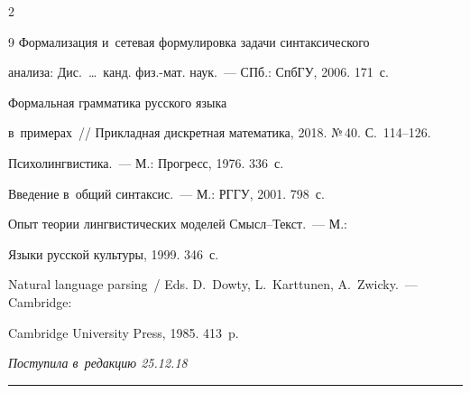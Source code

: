 \begin{multicols}{2}
{{\begin{thebibliography}{9}
 Формализация и~сетевая формулировка задачи синтаксического 

анализа: Дис.\ \ldots\ канд. физ.-мат. наук.~--- СПб.: СпбГУ, 2006. 171~с.


 Формальная грамматика русского языка 

в~примерах~// Прикладная дискретная математика, 2018. №\,40. С.~114--126.


 Психолингвистика.~--- М.: Прогресс, 1976. 336~с.


 Введение в~общий синтаксис.~--- М.: РГГУ, 2001. 798~с.


 Опыт теории лингвистических моделей Смысл--Текст.~--- М.: 

Языки русской культуры, 1999. 346~с.


Natural language parsing~/ Eds. D.~Dowty, L.~Karttunen, A.~Zwicky.~--- Cambridge: 

Cambridge University Press, 1985. 413~p.

 \end{thebibliography}



 }

 }



\end{multicols}



\vspace*{-12pt}



\hfill{\small\textit{Поступила в~редакцию 25.12.18}}



\vspace*{6pt}












\hrule



